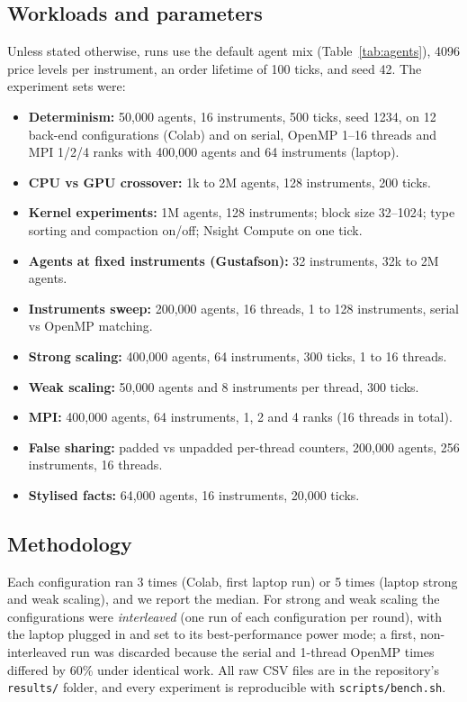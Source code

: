 \subsection{Workloads and parameters}
Unless stated otherwise, runs use the default agent mix (Table~\ref{tab:agents}), 4096 price
levels per instrument, an order lifetime of 100 ticks, and seed 42. The experiment sets were:
\begin{itemize}
\item \textbf{Determinism:} 50{,}000 agents, 16 instruments, 500 ticks, seed 1234, on 12 back-end
  configurations (Colab) and on serial, OpenMP 1--16 threads and MPI 1/2/4 ranks with 400{,}000
  agents and 64 instruments (laptop).
\item \textbf{CPU vs GPU crossover:} 1k to 2M agents, 128 instruments, 200 ticks.
\item \textbf{Kernel experiments:} 1M agents, 128 instruments; block size 32--1024; type sorting
  and compaction on/off; Nsight Compute on one tick.
\item \textbf{Agents at fixed instruments (Gustafson):} 32 instruments, 32k to 2M agents.
\item \textbf{Instruments sweep:} 200{,}000 agents, 16 threads, 1 to 128 instruments, serial vs
  OpenMP matching.
\item \textbf{Strong scaling:} 400{,}000 agents, 64 instruments, 300 ticks, 1 to 16 threads.
\item \textbf{Weak scaling:} 50{,}000 agents and 8 instruments per thread, 300 ticks.
\item \textbf{MPI:} 400{,}000 agents, 64 instruments, 1, 2 and 4 ranks (16 threads in total).
\item \textbf{False sharing:} padded vs unpadded per-thread counters, 200{,}000 agents,
  256 instruments, 16 threads.
\item \textbf{Stylised facts:} 64{,}000 agents, 16 instruments, 20{,}000 ticks.
\end{itemize}

\subsection{Methodology}
Each configuration ran 3 times (Colab, first laptop run) or 5 times (laptop strong and weak
scaling), and we report the median. For strong and weak scaling the configurations were
\emph{interleaved} (one run of each configuration per round), with the laptop plugged in and set to
its best-performance power mode; a first, non-interleaved run was discarded because the serial
and 1-thread OpenMP times differed by 60\% under identical work. All raw CSV files are in the
repository's \texttt{results/} folder, and every experiment is reproducible with
\texttt{scripts/bench.sh}.

